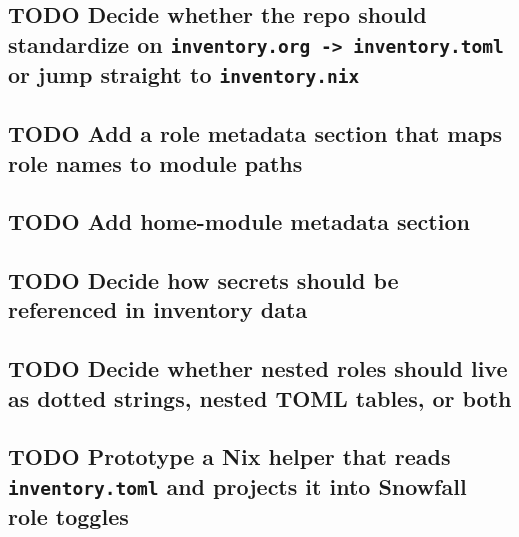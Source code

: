 \documentclass[11pt]{article}
\begin{document}
\subsection{{\bfseries\sffamily TODO} Decide whether the repo should standardize on \texttt{inventory.org -> inventory.toml} or jump straight to \texttt{inventory.nix}}
\label{sec:orgbb27944}
\subsection{{\bfseries\sffamily TODO} Add a role metadata section that maps role names to module paths}
\label{sec:org0acad7e}
\subsection{{\bfseries\sffamily TODO} Add home-module metadata section}
\label{sec:orge035d9e}
\subsection{{\bfseries\sffamily TODO} Decide how secrets should be referenced in inventory data}
\label{sec:org3df9fbf}
\subsection{{\bfseries\sffamily TODO} Decide whether nested roles should live as dotted strings, nested TOML tables, or both}
\label{sec:org39d6122}
\subsection{{\bfseries\sffamily TODO} Prototype a Nix helper that reads \texttt{inventory.toml} and projects it into Snowfall role toggles}
\label{sec:org52e072a}
\end{document}

